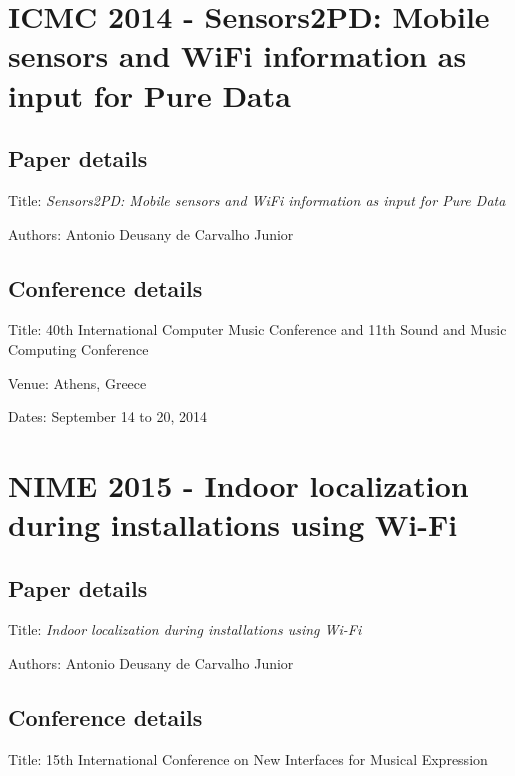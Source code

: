 \section{ICMC 2014 - Sensors2PD: Mobile sensors and WiFi information as input for Pure Data}
\label{ape:papericmc2014}

\subsection*{Paper details}

Title: \textit{Sensors2PD: Mobile sensors and WiFi information as input for Pure Data}

Authors: Antonio Deusany de Carvalho Junior

\subsection*{Conference details}

Title: 40th International Computer Music Conference and 11th Sound and Music Computing Conference

Venue: Athens, Greece

Dates: September 14 to 20, 2014 



\section{NIME 2015 - Indoor localization during installations using Wi-Fi}
\label{ape:papernime2015}

\subsection*{Paper details}

Title: \textit{Indoor localization during installations using Wi-Fi}

Authors: Antonio Deusany de Carvalho Junior

\subsection*{Conference details}

Title: 15th International Conference on New Interfaces for Musical Expression


